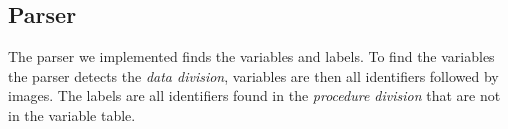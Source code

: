 \subsection{Parser}

The parser we implemented finds the variables and labels. To find the variables the parser detects the \textit{data division}, variables are then all identifiers followed by images. The labels are all identifiers found in the \textit{procedure division} that are not in the variable table.

